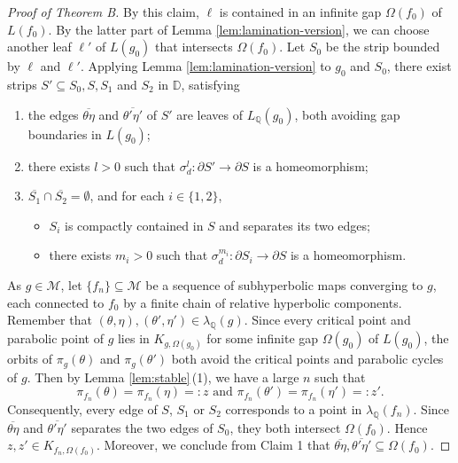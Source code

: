 \documentclass[a4paper,reqno,times, 11pt]{amsart}
\theoremstyle{remark}
\theoremstyle{plain}
\numberwithin{equation}{section}
\def\MMMM{{\cal M}}
\def\MMMM{\mathscr M}
\def\g{\gamma}
\def\D{\mathbb D}
\def\Q{\mathbb Q}
\def\cal{\mathcal}
\begin{document}
\begin{proof}[{Proof of Theorem B}]
By this claim, $\ell$ is contained in an infinite gap $\Omega(f_0)$ of $L(f_0)$. By the latter part of Lemma \ref{lem:lamination-version}, we can choose another leaf $\ell'$ of $L(g_0)$ that intersects $\Omega(f_0)$.  Let $S_0$ be the strip bounded by $\ell$ and $\ell'$. Applying Lemma \ref{lem:lamination-version} to $g_0$ and $S_0$, there exist strips $S'\subseteq S_0,S,S_1$ and $S_2$ in $\D$, satisfying
		\begin{enumerate}
			\item the edges $\overline{\theta\eta}$ and $\overline{\theta'\eta'}$ of $S'$ are leaves of $L_\Q(g_0)$,  both avoiding gap boundaries in $L(g_0)$;\vspace{1pt}
			\item there exists $l>0$ such that $\sigma_d^l:\partial S'\to\partial S$ is a homeomorphism;\vspace{1pt}
			\item $\overline{S_1}\cap \overline{S_2}=\emptyset$, and for each $i\in\{1,2\}$,
			\begin{itemize}
				\item $S_i$ is compactly contained in $S$ and separates its two edges;
				\item  there exists $m_i>0$ such that $\sigma_d^{m_i}:\partial S_i\to\partial S$ is a homeomorphism.
			\end{itemize}
		\end{enumerate}
		
As $g\in\MMMM$, let $\{f_n\}\subseteq\MMMM$ be a sequence of subhyperbolic maps converging to $g$, each connected to $f_0$ by a finite chain of relative hyperbolic components.
Remember that $(\theta,\eta),(\theta',\eta')\in\lambda_\Q(g)$. Since every critical point and parabolic point of $g$ lies in $K_{g,\Omega(g_0)}$ for some infinite gap $\Omega(g_0)$ of $L(g_0)$,
	the orbits of $\pi_g(\theta)$ and $\pi_g(\theta')$ both avoid the critical points and parabolic cycles of $g$. Then by Lemma \ref{lem:stable}\,(1), we have a large $n$ such that 
			\[\text{$\pi_{f_{n}}(\theta)=\pi_{f_{n}}(\eta)=:z$ and $\pi_{f_{n}}(\theta')=\pi_{f_{n}}(\eta')=:z'$}.\]
		Consequently, every edge of $S$, $S_1$ or $S_2$ corresponds to a point in $\lambda_\mathbb{Q}(f_{n})$. Since $\overline{\theta\eta}$ and $\overline{\theta'\eta'}$ separates the two edges of $S_0$, they both intersect $\Omega(f_0)$. Hence $z,z' \in K_{f_{n},\Omega(f_0)}$.  Moreover, we conclude from Claim 1 that  $\overline{\theta\eta},\overline{\theta'\eta'} \subseteq \Omega(f_0)$.
		

\end{proof}
\end{document}
